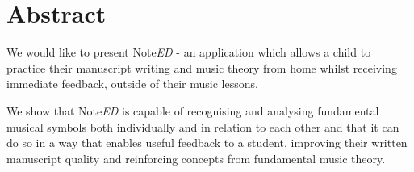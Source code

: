 \chapter*{Abstract}
We would like to present Note\emph{ED} - an application which allows a child to practice their manuscript writing and music theory from home whilst receiving immediate feedback, outside of their music lessons.

We show that Note\emph{ED} is capable of recognising and analysing fundamental musical symbols both individually and in relation to each other and that it can do so in a way that enables useful feedback to a student, improving their written manuscript quality and reinforcing concepts from fundamental music theory.

